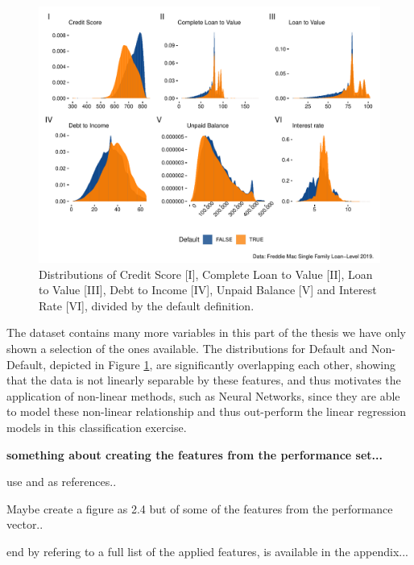 \begin{figure}[H]
    \centering
    \includegraphics[width = \textwidth]{Figures/pw_5.pdf}
    \caption{Distributions of Credit Score [I], Complete Loan to Value [II], Loan to Value [III], Debt to Income [IV], Unpaid Balance [V] and Interest Rate [VI], divided by the default definition.}
    \label{fig:pw_5}
\end{figure}

The dataset contains many more variables in this part of the thesis we have only shown a selection of the ones available. The distributions for Default and Non-Default, depicted in Figure \ref{fig:pw_5}, are significantly overlapping each other, showing that the data is not linearly separable by these features, and thus motivates the application of non-linear methods, such as Neural Networks, since they are able to model these non-linear relationship and thus out-perform the linear regression models in this classification exercise. 

\textbf{something about creating the features from the performance set...}

use \cite{Chana_2014} and \cite{Sirignano_2018} as references..

Maybe create a figure as 2.4 but of some of the features from the performance vector..

end by refering to a full list of the applied features, is available in the appendix...



